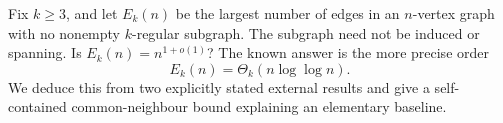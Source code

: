 Fix $k\geq3$, and let $E_k(n)$ be the largest number of edges in an
$n$-vertex graph with no nonempty $k$-regular subgraph. The subgraph
need not be induced or spanning. Is $E_k(n)=n^{1+o(1)}$?
The known answer is the more precise order
\[
 E_k(n)=\Theta_k(n\log\log n).
\]
We deduce this from two explicitly stated external results and give a
self-contained common-neighbour bound explaining an elementary baseline.
